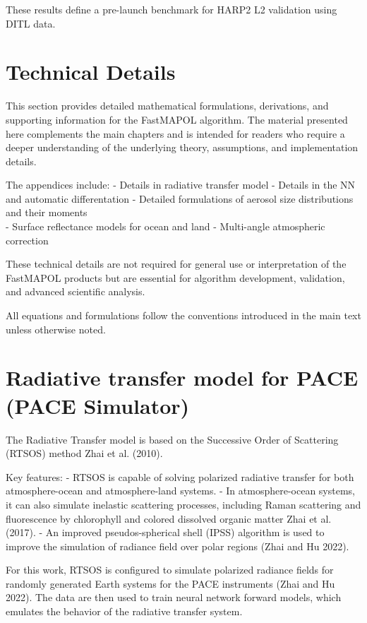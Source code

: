 \documentclass[
  letterpaper,
  open=any]{scrbook}
\begin{document}
These results define a pre-launch benchmark for HARP2 L2 validation
using DITL data.

\cleardoublepage
{}
{}
\appendix

\chapter{Technical Details}\label{technical-details}

This section provides detailed mathematical formulations, derivations,
and supporting information for the FastMAPOL algorithm. The material
presented here complements the main chapters and is intended for readers
who require a deeper understanding of the underlying theory,
assumptions, and implementation details.

The appendices include: - Details in radiative transfer model - Details
in the NN and automatic differentation - Detailed formulations of
aerosol size distributions and their moments\\
- Surface reflectance models for ocean and land - Multi-angle
atmospheric correction

These technical details are not required for general use or
interpretation of the FastMAPOL products but are essential for algorithm
development, validation, and advanced scientific analysis.

All equations and formulations follow the conventions introduced in the
main text unless otherwise noted.

\chapter{Radiative transfer model for PACE (PACE
Simulator)}\label{radiative-transfer-model-for-pace-pace-simulator}

The Radiative Transfer model is based on the Successive Order of
Scattering (RTSOS) method Zhai et al. (2010).

Key features: - RTSOS is capable of solving polarized radiative transfer
for both atmosphere-ocean and atmosphere-land systems. - In
atmosphere-ocean systems, it can also simulate inelastic scattering
processes, including Raman scattering and fluorescence by chlorophyll
and colored dissolved organic matter Zhai et al. (2017). - An improved
pseudos-spherical shell (IPSS) algorithm is used to improve the
simulation of radiance field over polar regions (Zhai and Hu 2022).

For this work, RTSOS is configured to simulate polarized radiance fields
for randomly generated Earth systems for the PACE instruments (Zhai and
Hu 2022). The data are then used to train neural network forward models,
which emulates the behavior of the radiative transfer system.
\end{document}
